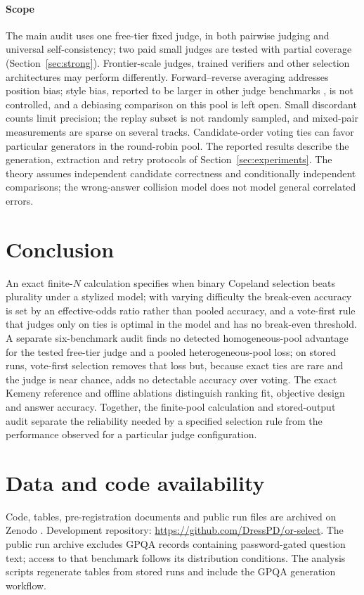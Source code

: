 \documentclass[preprint,11pt,number,sort&compress]{elsarticle}
\begin{document}
\paragraph{Scope}
\label{sec:future}

The main audit uses one free-tier fixed judge, in both pairwise judging and universal
self-consistency; two paid small judges are tested with partial coverage (Section~\ref{sec:strong}).
Frontier-scale
judges, trained verifiers and other selection architectures may perform
differently. Forward--reverse averaging addresses position bias; style bias,
reported to be larger in other judge benchmarks \citep{soumik2026judging},
is not controlled, and a debiasing comparison on this pool is left open. Small discordant counts limit precision; the replay subset is
not randomly sampled, and mixed-pair measurements are sparse on several
tracks. Candidate-order voting ties can favor particular generators in the
round-robin pool. The reported results describe the generation, extraction
and retry protocols of Section~\ref{sec:experiments}. The theory assumes
independent candidate correctness and
conditionally independent comparisons; the wrong-answer collision model
does not model general correlated errors.

\section{Conclusion}

An exact finite-$N$ calculation specifies when binary Copeland selection
beats plurality under a stylized model; with varying difficulty the
break-even accuracy is set by an effective-odds ratio rather than pooled
accuracy, and a vote-first rule that judges only on ties is optimal in the model
and has no break-even threshold. A separate six-benchmark audit
finds no detected homogeneous-pool advantage for the tested free-tier judge
and a pooled heterogeneous-pool loss; on stored runs, vote-first selection
removes that loss but, because exact ties are rare and the judge is near
chance, adds no detectable accuracy over voting. The exact Kemeny reference and
offline ablations distinguish ranking fit, objective design and answer
accuracy. Together, the finite-pool calculation and stored-output audit
separate the reliability needed by a specified selection rule from the
performance observed for a particular judge configuration.

\section*{Data and code availability}
Code, tables, pre-registration documents and public run files are archived
on Zenodo \citep{dressino2026orselect}. Development repository:
\url{https://github.com/DressPD/or-select}.
The public run archive excludes GPQA records containing password-gated
question text; access to that benchmark follows its distribution conditions.
The analysis scripts regenerate tables from stored runs and include the
GPQA generation workflow.
\end{document}
